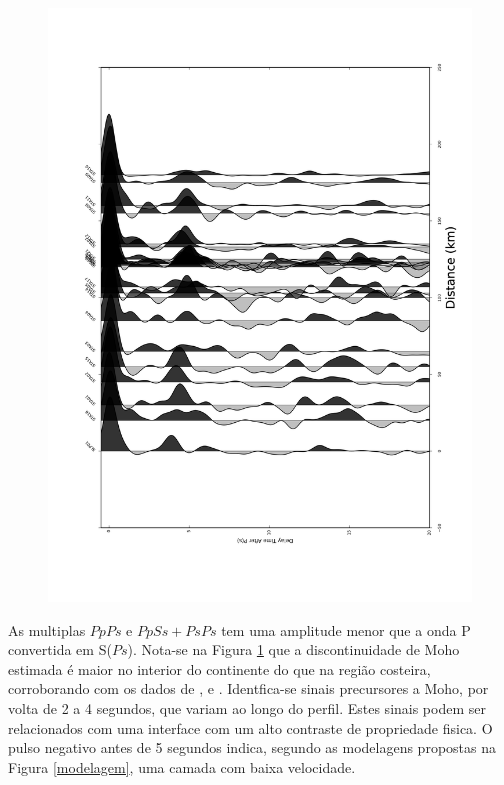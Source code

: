 \begin{figure}[!ht]
\centering
\includegraphics[scale=0.15]{Perfil_RF_NWLS.png}
\caption{}
\label{RF_perfil_NW}
\end{figure}


As multiplas $PpPs$ e $PpSs+PsPs$ tem uma amplitude menor que a onda P convertida em S($Ps$). Nota-se na Figura \ref{RF_perfil_NW} que a discontinuidade de Moho estimada é maior no interior do continente do que na região costeira, corroborando com os dados de \cite{Assumpcao_America_2013}, \citep{Assumpcao_Brazil_2013} e \cite{van_der_meijde_gravity_2013} . Identfica-se sinais precursores a Moho, por volta de 2 a 4 segundos, que variam ao longo do perfil. Estes sinais podem ser relacionados com uma interface com um alto contraste de propriedade fisica. O pulso negativo antes de 5 segundos indica, segundo as modelagens propostas na Figura \ref{modelagem}, uma camada com baixa velocidade.



